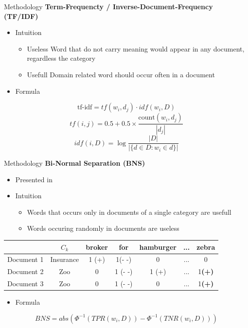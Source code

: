 \begin{frame}[label=metho]{Methodology}
	\textbf{Term-Frequencty / Inverse-Document-Frequency (TF/IDF)}
	\begin{itemize}
		\item Intuition
		\begin{itemize}
			\item Useless Word that do not carry meaning would appear in any document, regardless the category
			\item Usefull Domain related word should occur often in a document
		\end{itemize}
		\item Formula
\end{itemize}
$$ \textrm{tf-idf} = tf(w_i,d_j) \cdot idf(w_i, D)$$
$$tf(i, j) = 0.5 + 0.5 \times \frac{\textrm{count}(w_i, d_j)}{|d_j|}  $$
$$idf(i, D) = \log \frac{|D|}{|\{d \in D :  w_i \in d \}|}$$

\end{frame}


\begin{frame}[label=metho]{Methodology}
	\textbf{Bi-Normal Separation (BNS)}
	\begin{itemize}
				\item Presented in \cite{Forman}
		\item Intuition
		\begin{itemize}
			\item Words that occurs only in documents of a single category are usefull
			\item Words occuring randomly in documents are useless
		\end{itemize}
	\end{itemize}
		\begin{table}[H]
		\begin{tabular}{|c|c|c|c|c|c|c|}
			\hline 
			& $C_k$&  broker  & for & hamburger & ... & zebra   \\ 
			\hline 
			Document 1 &  Insurance &  1 (+) & 1(- -) & 0 & ... & 0 \\ 
			\hline 
			Document 2& Zoo &   0 &  1 (- -) & 1 (+) & ... & 1\textbf{(+)} \\ 
			\hline 
			Document 3 & Zoo &  0 & 1 (- -) & 0 & ... & 1\textbf{(+)}  \\ 
			\hline 
			
		\end{tabular} 
		
	\end{table}
\begin{itemize}
		\item Formula
\end{itemize}
$$BNS = abs(\Phi^{-1}(TPR(w_i, D))- \Phi^{-1}(TNR(w_i, D)))$$

\end{frame}


